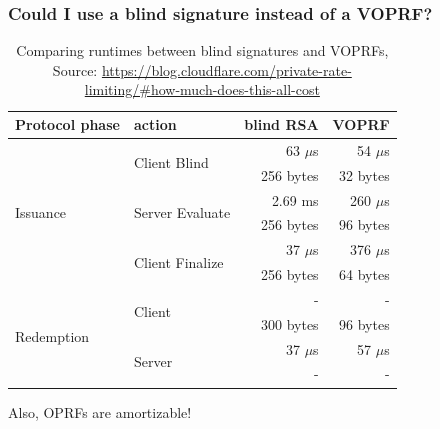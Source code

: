 \documentclass[10pt]{beamer}
\begin{document}
\begin{frame}
  \frametitle{Could I use a blind signature instead of a VOPRF?}
  \begin{table}
    \begin{tabular}{l l r r}
      \toprule
      Protocol phase & action & blind RSA & VOPRF \\
      \midrule
      \multirow[c]{6}{*}{Issuance} & \multirow[c]{2}{*}{Client Blind} & 63 $\mu$s
                                   & 54 $\mu$s\\
                                   & & 256 bytes &  32 bytes \\
                                   & \multirow[c]{2}{*}{Server Evaluate} & 2.69 ms
                                   & 260 $\mu$s \\
                                   & & 256 bytes &  96 bytes \\
                                   & \multirow[c]{2}{*}{Client Finalize} & 37
                                   $\mu$s
                                   & 376 $\mu$s \\
                                   & & 256 bytes &  64 bytes \\
                                   \midrule
      \multirow[c]{4}{*}{Redemption} & \multirow[c]{2}{*}{Client} & -
                                     & -\\
                                     & & 300 bytes &  96 bytes \\
                                     & \multirow[c]{2}{*}{Server} & 37 $\mu$s
                                     & 57 $\mu$s \\
                                     & & - &  - \\
                                     \bottomrule
    \end{tabular}
    \caption{Comparing runtimes between blind signatures and VOPRFs,
    Source: \url{https://blog.cloudflare.com/private-rate-limiting/\#how-much-does-this-all-cost}}
  \end{table}\pause
  \alert{Also, OPRFs are amortizable!}
\end{frame}
\end{document}
